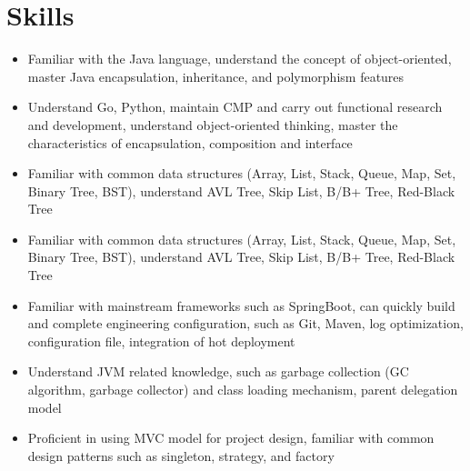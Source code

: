 \documentclass{resume}
\newcommand{\en}[1]{#1}
\newcommand{\zh}[1]{}
\begin{document}
\section{\en{Skills}\zh{技能}}
\begin{itemize}[parsep=0.25ex]
      \item \en{Familiar with the Java language, understand the concept of object-oriented, master Java encapsulation, inheritance, and polymorphism features}
            \zh{熟悉Java语言，理解面向对象思想，掌握 Java 封装、继承和多态特性}

      \item \en{Understand Go, Python, maintain CMP and carry out functional research and development, understand object-oriented thinking, master the characteristics of encapsulation, composition and interface}
            \zh{了解Go、Python，维护CMP并进行了功能研发，理解面向对象思想，掌握封装、组合和接口的特性}

      \item \en{Familiar with common data structures (Array, List, Stack, Queue, Map, Set, Binary Tree, BST),
                  understand AVL Tree, Skip List, B/B+ Tree, Red-Black Tree}
            \zh{熟悉常见集合（List、Set、Map）、多线程并发（读写锁、阻塞队列、线程池、ConcurrentHashMap等），了解悲观、乐观并发控制以及MVCC等并发控制机制}

      \item \en{Familiar with common data structures (Array, List, Stack, Queue, Map, Set, Binary Tree, BST),
                  understand AVL Tree, Skip List, B/B+ Tree, Red-Black Tree}
            \zh{熟悉常用数据结构（Array、List、Stack、Queue、Map、Set、Binary Tree、BST），
                  了解AVL树、跳表、B/B+树、Red-Black Tree}

      \item \en{Familiar with mainstream frameworks such as SpringBoot, can quickly build and complete engineering configuration, such as Git, Maven, log optimization, configuration file, integration of hot deployment}
            \zh{熟悉SpringBoot等主流框架，可以快速构建并完成工程配置，如Git，Maven，日志优化，配置文件，集成热部署}

      \item \en{Understand JVM related knowledge, such as garbage collection (GC algorithm, garbage collector) and class loading mechanism, parent delegation model}
            \zh{了解JVM相关知识，如垃圾回收（GC算法、垃圾收集器）和类加载机制、双亲委派机模型}

      \item \en{Proficient in using MVC model for project design, familiar with common design patterns such as singleton, strategy, and factory}
            \zh{熟练使用 MVC 模式进行项目设计，熟悉单例，策略，工厂模式等常见的设计模式}


\end{itemize}
\end{document}
